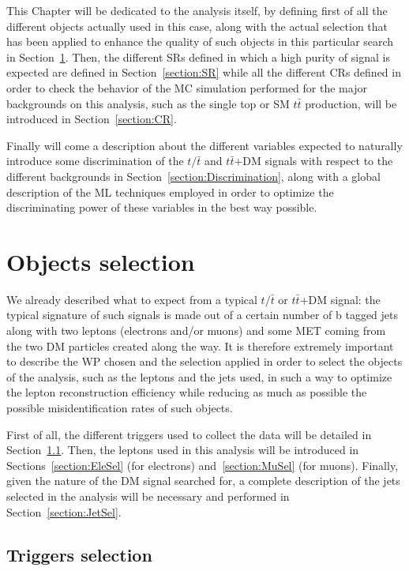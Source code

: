 \documentclass[a4paper, 10pt, openright]{report}
\begin{document}
This Chapter will be dedicated to the analysis itself, by defining first of all the different objects actually used in this case, along with the actual selection that has been applied to enhance the quality of such objects in this particular search in Section~\ref{section:Selection}. Then, the different \acfp{SR} defined in which a high purity of signal is expected are defined in Section~\ref{section:SR} while all the different \acfp{CR} defined in order to check the behavior of the \ac{MC} simulation performed for the major backgrounds on this analysis, such as the single top or \ac{SM} $t \bar t$ production, will be introduced in Section~\ref{section:CR}. 

Finally will come a description about the different variables expected to naturally introduce some discrimination of the $t/\bar t$ and $t \bar t$+DM signals with respect to the different backgrounds in Section~\ref{section:Discrimination}, along with a global description of the \ac{ML} techniques employed in order to optimize the discriminating power of these variables in the best way possible.

\section{Objects selection} \label{section:Selection}

We already described what to expect from a typical $t/\bar t$ or $t \bar t$+DM signal: the typical signature of such signals is made out of a certain number of b tagged jets along with two leptons (electrons and/or muons) and some \ac{MET} coming from the two \ac{DM} particles created along the way. It is therefore extremely important to describe the \ac{WP} chosen and the selection applied in order to select the objects of the analysis, such as the leptons and the jets used, in such a way to optimize the lepton reconstruction efficiency while reducing as much as possible the possible misidentification rates of such objects.

First of all, the different triggers used to collect the data will be detailed in Section~\ref{section:Triggers}. Then, the leptons used in this analysis will be introduced in Sections~\ref{section:EleSel} (for electrons) and~\ref{section:MuSel} (for muons). Finally, given the nature of the \ac{DM} signal searched for, a complete description of the jets selected in the analysis will be necessary and performed in Section~\ref{section:JetSel}.

\subsection{Triggers selection} \label{section:Triggers}
\end{document}
